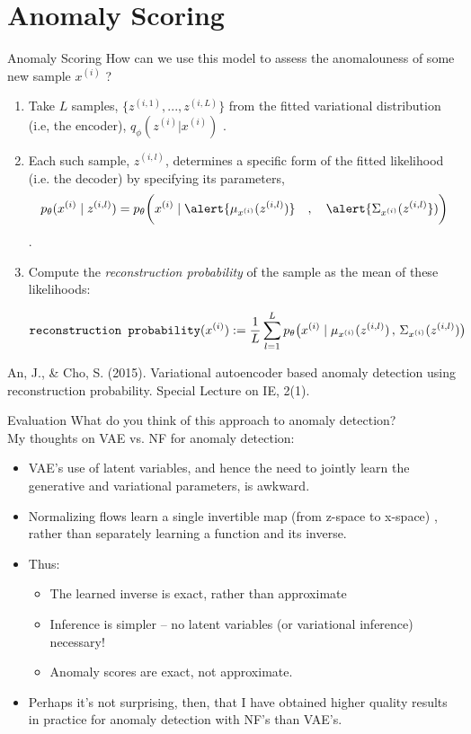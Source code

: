 \documentclass[10pt]{beamer}
\newcommand{\obs}{x^{(i)} }
\newcommand{\alatent}{z^{(i)} }
\begin{document}
\section{Anomaly Scoring}

\begin{frame}{Anomaly Scoring}
\footnotesize How can we use this model to assess the anomalouness of some new sample $x^{(i)}$ ? \pause
\vfill 

\begin{enumerate}
\item Take $L$ samples, $\{z^{(i,1)}, ..., z^{(i,L)} \}$ from the fitted variational distribution (i.e, the encoder), $q_\phi(\alatent| x^{(i)})$ . \pause
\item   Each such sample, $z^{(i,l)}$, determines a specific form of the fitted likelihood (i.e. the decoder) by specifying its \alert{parameters},  \
\[ p_\theta(\obs \cond z^{(i,l)}) = p_\theta \bp{\obs \cond \alert{\mu_{\obs} (z^{(i,l)})} \quad , \quad \alert{\Sigma_{\obs} (z^{(i,l)}})} \].  \pause 
\item Compute the \textit{reconstruction probability} of the sample as the mean of these likelihoods:

\[ \texttt{reconstruction probability}(x^{(i)}) := \df{1}{L} \ds\sum_{l=1}^L p_\theta \big(\obs \cond \mu_{\obs} (z^{(i,l)}) \, , \, \Sigma_{\obs} (z^{(i,l)}) \big)\]
\end{enumerate}

\vfill \vfill
\hfill \tiny An, J., \& Cho, S. (2015). Variational autoencoder based anomaly detection using reconstruction probability. Special Lecture on IE, 2(1).
\end{frame}

\begin{frame}{Evaluation}
What do you think of this approach to anomaly detection? \\
\pause 
\vfill
My thoughts on VAE vs. NF for anomaly detection:
\begin{itemize}
\item  VAE's use of latent variables, and hence the need to jointly learn the generative and variational parameters, is awkward.
\item Normalizing flows learn a single invertible map \tiny (from z-space to x-space) \normalsize, rather than separately learning a function and its inverse.  
\item Thus:

	\begin{itemize}
	\item  The learned inverse is exact, rather than approximate 
	\item Inference is simpler -- no latent variables (or variational inference) necessary!  
    \item Anomaly scores are exact, not approximate.
	\end{itemize}
\item Perhaps it's not surprising, then, that I have obtained higher quality results in practice for anomaly detection with NF's than VAE's.
\end{itemize}

\end{frame}
\end{document}
